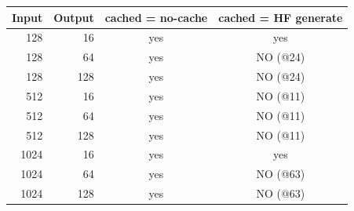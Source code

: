 \begin{tabular}{rrcc}\toprule Input & Output & cached = no-cache & cached = HF generate\\\midrule
128 & 16 & yes & yes\\
128 & 64 & yes & NO (@24)\\
128 & 128 & yes & NO (@24)\\
512 & 16 & yes & NO (@11)\\
512 & 64 & yes & NO (@11)\\
512 & 128 & yes & NO (@11)\\
1024 & 16 & yes & yes\\
1024 & 64 & yes & NO (@63)\\
1024 & 128 & yes & NO (@63)\\
\bottomrule\end{tabular}